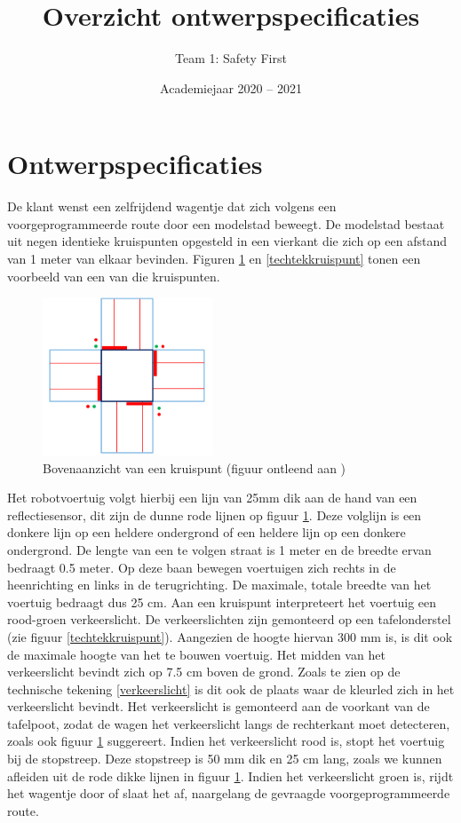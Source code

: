 \documentclass[a4paper,kulak]{kulakarticle} %
\date{Academiejaar 2020 -- 2021}
\title{Overzicht ontwerpspecificaties}
\author{Team 1: Safety First}
\begin{document}
\maketitle

\section*{Ontwerpspecificaties}

De klant wenst een zelfrijdend wagentje dat zich volgens een voorgeprogrammeerde route door een modelstad beweegt. De modelstad bestaat uit negen identieke kruispunten opgesteld in een vierkant die zich op een afstand van 1 meter van elkaar bevinden. Figuren \ref{kruispunt} en \ref{techtekkruispunt} tonen een voorbeeld van een van die kruispunten.

\begin{figure}[h]
	\centering
	\includegraphics[width=0.45\textwidth]{kruispunt.png}
	\caption{Bovenaanzicht van een kruispunt (figuur ontleend aan \cite{teamopdracht})}
	\label{kruispunt}
\end{figure}


Het robotvoertuig volgt hierbij een lijn van 25mm dik aan de hand van een reflectiesensor, dit zijn de dunne rode lijnen op figuur \ref{kruispunt}. Deze volglijn is een donkere lijn op een heldere ondergrond of een heldere lijn op een donkere ondergrond. De lengte van een te volgen straat is 1 meter en de breedte ervan bedraagt 0.5 meter. Op deze baan bewegen voertuigen zich rechts in de heenrichting en links in de terugrichting. De maximale, totale breedte van het voertuig bedraagt dus 25 cm. Aan een kruispunt interpreteert het voertuig een rood-groen verkeerslicht. De verkeerslichten zijn gemonteerd op een tafelonderstel (zie figuur \ref{techtekkruispunt}). Aangezien de hoogte hiervan 300 mm is, is dit ook de maximale hoogte van het te bouwen voertuig. Het midden van het verkeerslicht bevindt zich op 7.5 cm boven de grond. Zoals te zien op de technische tekening \ref{verkeerslicht} is dit ook de plaats waar de kleurled zich in het verkeerslicht bevindt. Het verkeerslicht is gemonteerd aan de voorkant van de tafelpoot, zodat de wagen het verkeerslicht langs de rechterkant moet detecteren, zoals ook figuur \ref{kruispunt} suggereert.  Indien het verkeerslicht rood is, stopt het voertuig bij de stopstreep. Deze stopstreep is 50 mm dik en 25 cm lang, zoals we kunnen afleiden uit de rode dikke lijnen in figuur \ref{kruispunt}. Indien het verkeerslicht groen is, rijdt het wagentje door of slaat het af, naargelang de gevraagde voorgeprogrammeerde route.
\end{document}

